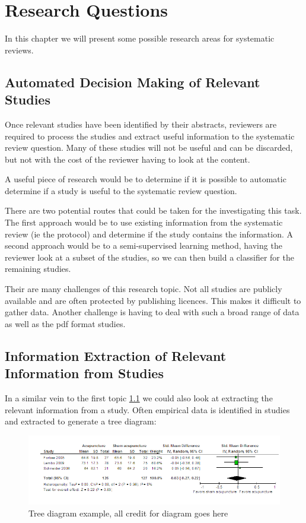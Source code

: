 \chapter{Research Questions} \label{rq}

In this chapter we will present some possible research areas for systematic reviews.

\section{Automated Decision Making of Relevant Studies} \label{dm}

Once relevant studies have been identified by their abstracts, reviewers are required to process the studies and extract useful information to the systematic review question. Many of these studies will not be useful and can be discarded, but not with the cost of the reviewer having to look at the content.

A useful piece of research would be to determine if it is possible to automatic determine if a study is useful to the systematic review question.

There are two potential routes that could be taken for the investigating this task. The first approach would be to use existing information from the systematic review (ie the protocol) and determine if the study contains the information. A second approach would be to a semi-supervised learning method, having the reviewer look at a subset of the studies, so we can then build a classifier for the remaining studies.

Their are many challenges of this research topic. Not all studies are publicly available and are often protected by publishing licences. This makes it difficult to gather data. Another challenge is having to deal with such a broad range of data as well as the pdf format studies.

\section{Information Extraction of Relevant Information from Studies} \label{ie}

In a similar vein to the first topic \ref{dm} we could also look at extracting the relevant information from a study. Often empirical data is identified in studies and extracted to generate a tree diagram:

\begin{figure}[H]
\center
\includegraphics[width=16cm]{figures/tree.png}
\caption{Tree diagram example, all credit for diagram goes here \cite{Manheimer2012}}
\end{figure}

